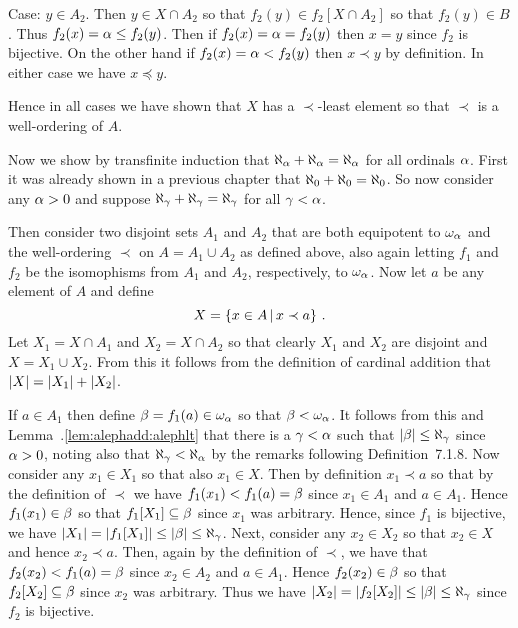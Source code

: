 \begin{solution}
\begin{indpar}
        Case: $y \in A_2$.
        Then $y \in X \cap A_2$ so that $f_2(y) \in f_2[X \cap A_2]$ so that $f_2(y) \in B$.
        Thus $f_2(x) = \alpha \leq f_2(y)$.
        Then if $f_2(x) = \alpha = f_2(y)$ then $x = y$ since $f_2$ is bijective.
        On the other hand if $f_2(x) = \alpha < f_2(y)$ then $x \prec y$ by definition.
        In either case we have $x \preceq y$.
    \end{indpar}
    Hence in all cases we have shown that $X$ has a $\prec$-least element so that $\prec$ is a well-ordering of $A$.

    Now we show by transfinite induction that $\aleph_\alpha + \aleph_\alpha = \aleph_\alpha$ for all ordinals $\alpha$.
    First it was already shown in a previous chapter that $\aleph_0 + \aleph_0 = \aleph_0$.
    So now consider any $\alpha > 0$ and suppose $\aleph_\gamma + \aleph_\gamma = \aleph_\gamma$ for all $\gamma < \alpha$.

    Then consider two disjoint sets $A_1$ and $A_2$ that are both equipotent to $\omega_\alpha$ and the well-ordering $\prec$ on $A = A_1 \cup A_2$ as defined above, also again letting $f_1$ and $f_2$ be the isomophisms from $A_1$ and $A_2$, respectively, to $\omega_\alpha$.
    Now let $a$ be any element of $A$ and define
    $$
    X = \left\{ x \in A \,|\, x \prec a \right\} \,.
    $$
    Let $X_1 = X \cap A_1$ and $X_2 = X \cap A_2$ so that clearly $X_1$ and $X_2$ are disjoint and $X = X_1 \cup X_2$.
    From this it follows from the definition of cardinal addition that $\left| X \right| = \left| X_1 \right| + \left| X_2 \right|$.

    If $a \in A_1$ then define $\beta = f_1(a) \in \omega_\alpha$ so that $\beta < \omega_\alpha$.
    It follows from this and Lemma~\ex.\ref{lem:alephadd:alephlt} that there is a $\gamma < \alpha$ such that $\left| \beta \right| \leq \aleph_\gamma$ since $\alpha > 0$, noting also that $\aleph_\gamma < \aleph_\alpha$ by the remarks following Definition~7.1.8.
    Now consider any $x_1 \in X_1$ so that also $x_1 \in X$.
    Then by definition $x_1 \prec a$ so that by the definition of $\prec$ we have $f_1(x_1) < f_1(a) = \beta$ since $x_1 \in A_1$ and $a \in A_1$.
    Hence $f_1(x_1) \in \beta$ so that $f_1[X_1] \subseteq \beta$ since $x_1$ was arbitrary.
    Hence, since $f_1$ is bijective, we have $\left| X_1 \right| = \left| f_1[X_1] \right| \leq \left| \beta \right| \leq \aleph_\gamma$.
    Next, consider any $x_2 \in X_2$ so that $x_2 \in X$ and hence $x_2 \prec a$.
    Then, again by the definition of $\prec$, we have that $f_2(x_2) < f_1(a) = \beta$ since $x_2 \in A_2$ and $a \in A_1$.
    Hence $f_2(x_2) \in \beta$ so that $f_2[X_2] \subseteq \beta$ since $x_2$ was arbitrary.
    Thus we have $\left| X_2 \right| = \left| f_2[X_2] \right| \leq \left| \beta \right| \leq \aleph_\gamma$ since $f_2$ is bijective.


\end{solution}
